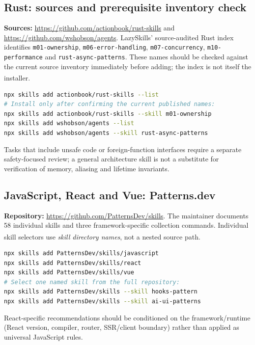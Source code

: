 \documentclass[11pt,letterpaper]{article}
\newcommand{\src}[1]{\textsuperscript{\textcolor{teal}{\cite{#1}}}}
\begin{document}
\subsection{Rust: sources and prerequisite inventory check}
\textbf{Sources:} \url{https://github.com/actionbook/rust-skills} and \url{https://github.com/wshobson/agents}. LazySkills' source-audited Rust index identifies \texttt{m01-ownership}, \texttt{m06-error-handling}, \texttt{m07-concurrency}, \texttt{m10-performance} and \texttt{rust-async-patterns}. These names should be checked against the current source inventory immediately before adding; the index is not itself the installer.\src{rustindex,rustrepo}
\begin{lstlisting}[language=bash]
npx skills add actionbook/rust-skills --list
# Install only after confirming the current published names:
npx skills add actionbook/rust-skills --skill m01-ownership
npx skills add wshobson/agents --list
npx skills add wshobson/agents --skill rust-async-patterns
\end{lstlisting}
Tasks that include unsafe code or foreign-function interfaces require a separate safety-focused review; a general architecture skill is not a substitute for verification of memory, aliasing and lifetime invariants.

\subsection{JavaScript, React and Vue: Patterns.dev}
\textbf{Repository:} \url{https://github.com/PatternsDev/skills}. The maintainer documents 58 individual skills and three framework-specific collection commands. Individual skill selectors use \emph{skill directory names}, not a nested source path.\src{patternsrepo,patternsweb}
\begin{lstlisting}[language=bash]
npx skills add PatternsDev/skills/javascript
npx skills add PatternsDev/skills/react
npx skills add PatternsDev/skills/vue
# Select one named skill from the full repository:
npx skills add PatternsDev/skills --skill hooks-pattern
npx skills add PatternsDev/skills --skill ai-ui-patterns
\end{lstlisting}
React-specific recommendations should be conditioned on the framework/runtime (React version, compiler, router, SSR/client boundary) rather than applied as universal JavaScript rules.
\end{document}
